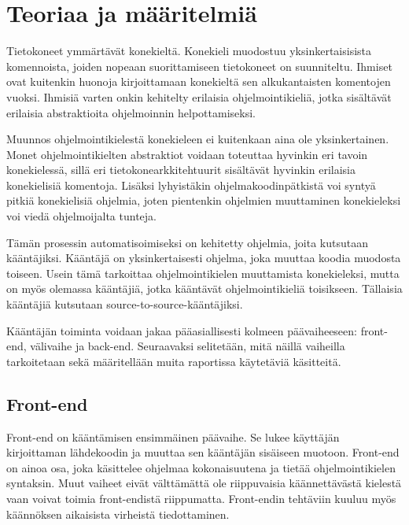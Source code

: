 
\section{Teoriaa ja määritelmiä}
Tietokoneet ymmärtävät konekieltä.
Konekieli muodostuu yksinkertaisisista komennoista,
joiden nopeaan suorittamiseen tietokoneet on suunniteltu.
Ihmiset ovat kuitenkin huonoja kirjoittamaan konekieltä
sen alkukantaisten komentojen vuoksi.
Ihmisiä varten onkin kehitelty erilaisia ohjelmointikieliä,
jotka sisältävät erilaisia abstraktioita ohjelmoinnin helpottamiseksi.

Muunnos ohjelmointikielestä konekieleen ei kuitenkaan aina ole yksinkertainen.
Monet ohjelmointikielten abstraktiot voidaan toteuttaa hyvinkin eri tavoin konekielessä,
sillä eri tietokonearkkitehtuurit sisältävät hyvinkin erilaisia konekielisiä komentoja.
Lisäksi lyhyistäkin ohjelmakoodinpätkistä voi syntyä pitkiä konekielisiä ohjelmia,
joten pientenkin ohjelmien muuttaminen konekieleksi voi viedä ohjelmoijalta tunteja.

Tämän prosessin automatisoimiseksi on kehitetty ohjelmia, joita kutsutaan kääntäjiksi.
Kääntäjä on yksinkertaisesti ohjelma, joka muuttaa koodia muodosta toiseen.
Usein tämä tarkoittaa ohjelmointikielen muuttamista konekieleksi,
mutta on myös olemassa kääntäjiä,
jotka kääntävät ohjelmointikieliä toisikseen.
Tällaisia kääntäjiä kutsutaan source-to-source-kääntäjiksi.

Kääntäjän toiminta voidaan jakaa pääasiallisesti kolmeen päävaiheeseen:
front-end, välivaihe ja back-end.
Seuraavaksi selitetään, mitä näillä vaiheilla tarkoitetaan
sekä määritellään muita raportissa käytetäviä käsitteitä.


\subsection{Front-end}
Front-end on kääntämisen ensimmäinen päävaihe.
Se lukee käyttäjän kirjoittaman lähdekoodin
ja muuttaa sen kääntäjän sisäiseen muotoon.
Front-end on ainoa osa, joka käsittelee ohjelmaa kokonaisuutena
ja tietää ohjelmointikielen syntaksin.
Muut vaiheet eivät välttämättä ole riippuvaisia käännettävästä
kielestä vaan voivat toimia front-endistä riippumatta.
Front-endin tehtäviin kuuluu myös käännöksen aikaisista virheistä tiedottaminen.

